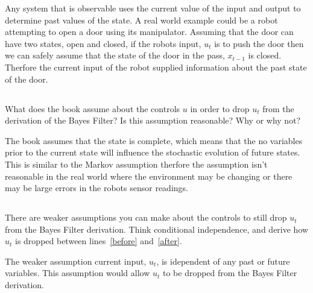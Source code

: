 \documentclass{article}
\begin{document}
\vspace{5mm}
Any system that is observable uses the current value of the input and output to determine past values of the state. A real world example could be a robot attempting to open a door using its manipulator.  Assuming that the door can have two states, open and closed, if the robots input, $u_t$ is to push the door then we can safely assume that the state of the door in the pass, $x_{t-1}$ is closed. Therfore the current input of the robot supplied information about the past state of the door.

\newpage
\subsection{}
What does the book assume about the controls $u$ in order to drop $u_t$ from the derivation of the Bayes Filter?  Is this assumption reasonable?  Why or why not?
\vspace{5mm}

The book assumes that the state is complete, which means that the no variables prior to the current state will influence the stochastic evolution of future states.  This is similar to the Markov assumption therfore the assumption isn't reasonable in the real world where the environment may be changing or there may be large errors in the robots sensor readings. 

\subsection{}
There are weaker assumptions you can make about the controls to still drop $u_t$ from the Bayes Filter derivation.  Think conditional independence, and derive how $u_t$ is dropped between lines~\eqref{before} and~\eqref{after}.
\vspace{5mm}

The weaker assumption current input, $u_t$, is idependent of any past or future variables. This assumption would allow $u_t$ to be dropped from the Bayes Filter derivation.
\end{document}
